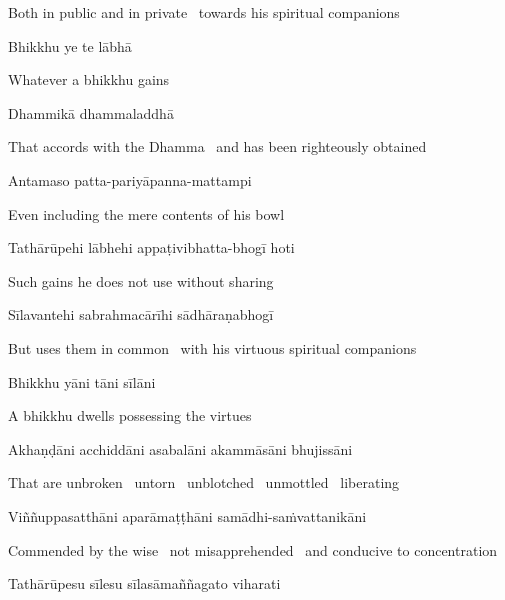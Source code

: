 \begin{english}
  Both in public and in private \breathmark\ towards his spiritual companions
\end{english}

Bhikkhu ye te lābhā

\begin{english}
  Whatever a bhikkhu gains
\end{english}

Dhammikā dhammaladdhā

\begin{english}
  That accords with the Dhamma \breathmark\ and has been righteously obtained
\end{english}

Antamaso patta-pariyāpanna-mattampi

\begin{english}
  Even including the mere contents of his bowl
\end{english}

Tathārūpehi lābhehi appaṭivibhatta-bhogī hoti

\begin{english}
  Such gains he does not use without sharing
\end{english}

Sīlavantehi sabrahmacārīhi sādhāraṇabhogī

\begin{english}
  But uses them in common \breathmark\ with his virtuous spiritual companions
\end{english}

Bhikkhu yāni tāni sīlāni

\begin{english}
  A bhikkhu dwells possessing the virtues
\end{english}

Akhaṇḍāni acchiddāni asabalāni akammāsāni bhujissāni

\begin{english}
  That are unbroken \breathmark\ untorn \breathmark\ unblotched \breathmark\ unmottled \breathmark\ liberating
\end{english}

Viññuppasatthāni aparāmaṭṭhāni samādhi-saṁvattanikāni

\begin{english}
  Commended by the wise \breathmark\ not misapprehended \breathmark\ and conducive to concentration
\end{english}

Tathārūpesu sīlesu sīlasāmaññagato viharati

